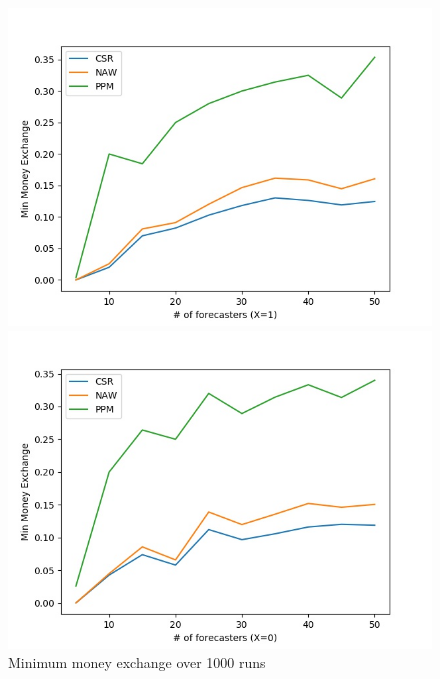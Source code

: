 \documentclass[english,10pt]{article}
\begin{document}
\begin{enumerate}
\begin{enumerate}
        	\begin{figure}[H]
        	\centering
        	\begin{minipage}{0.48\textwidth}
        	\includegraphics[width = \textwidth]{(Beta_0dot3_0dot3)Min_MnEx(X=1).jpg}
        	\end{minipage}
        	\begin{minipage}{0.48\textwidth}
        	\includegraphics[width = \textwidth]{(Beta_0dot3_0dot3)Min_MnEx(X=0).jpg}
        	\end{minipage}
        	\caption{Minimum money exchange over 1000 runs}
        	\end{figure}
	

\end{enumerate}
\end{enumerate}
\end{document}
